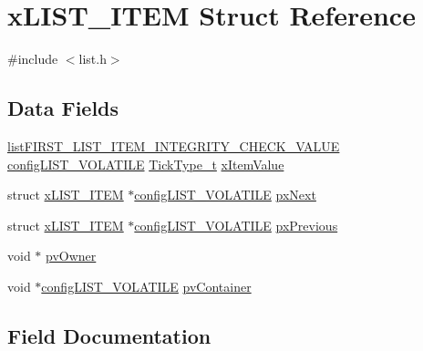 \hypertarget{structx_l_i_s_t___i_t_e_m}{}\section{x\+L\+I\+S\+T\+\_\+\+I\+T\+EM Struct Reference}
\label{structx_l_i_s_t___i_t_e_m}


{\ttfamily \#include $<$list.\+h$>$}

\subsection*{Data Fields}
\begin{DoxyCompactItemize}
\item 
\mbox{\hyperlink{list_8h_a3611bd5d5d87cb26ac1dc7a4852b94a0}{list\+F\+I\+R\+S\+T\+\_\+\+L\+I\+S\+T\+\_\+\+I\+T\+E\+M\+\_\+\+I\+N\+T\+E\+G\+R\+I\+T\+Y\+\_\+\+C\+H\+E\+C\+K\+\_\+\+V\+A\+L\+UE}} \mbox{\hyperlink{list_8h_a2d5de557c5561c8980d1bf51d87d8cba}{config\+L\+I\+S\+T\+\_\+\+V\+O\+L\+A\+T\+I\+LE}} \mbox{\hyperlink{portmacro_8h_aa69c48c6e902ce54f70886e6573c92a9}{Tick\+Type\+\_\+t}} \mbox{\hyperlink{structx_l_i_s_t___i_t_e_m_aa6f3caf3e73107fb0da6fede4b06f104}{x\+Item\+Value}}
\item 
struct \mbox{\hyperlink{structx_l_i_s_t___i_t_e_m}{x\+L\+I\+S\+T\+\_\+\+I\+T\+EM}} $\ast$\mbox{\hyperlink{list_8h_a2d5de557c5561c8980d1bf51d87d8cba}{config\+L\+I\+S\+T\+\_\+\+V\+O\+L\+A\+T\+I\+LE}} \mbox{\hyperlink{structx_l_i_s_t___i_t_e_m_a77927cd93dda0c59b3855aca58881ca1}{px\+Next}}
\item 
struct \mbox{\hyperlink{structx_l_i_s_t___i_t_e_m}{x\+L\+I\+S\+T\+\_\+\+I\+T\+EM}} $\ast$\mbox{\hyperlink{list_8h_a2d5de557c5561c8980d1bf51d87d8cba}{config\+L\+I\+S\+T\+\_\+\+V\+O\+L\+A\+T\+I\+LE}} \mbox{\hyperlink{structx_l_i_s_t___i_t_e_m_a0294e93ecc18bcdb723038af1027505d}{px\+Previous}}
\item 
void $\ast$ \mbox{\hyperlink{structx_l_i_s_t___i_t_e_m_aeb54d184fbcccb5748e66cb2426e3b3f}{pv\+Owner}}
\item 
void $\ast$\mbox{\hyperlink{list_8h_a2d5de557c5561c8980d1bf51d87d8cba}{config\+L\+I\+S\+T\+\_\+\+V\+O\+L\+A\+T\+I\+LE}} \mbox{\hyperlink{structx_l_i_s_t___i_t_e_m_a0a7b95bc338d7d9df18e10607893d103}{pv\+Container}}
\end{DoxyCompactItemize}


\subsection{Field Documentation}
\mbox{\label{structx_l_i_s_t___i_t_e_m_a0a7b95bc338d7d9df18e10607893d103}} 
